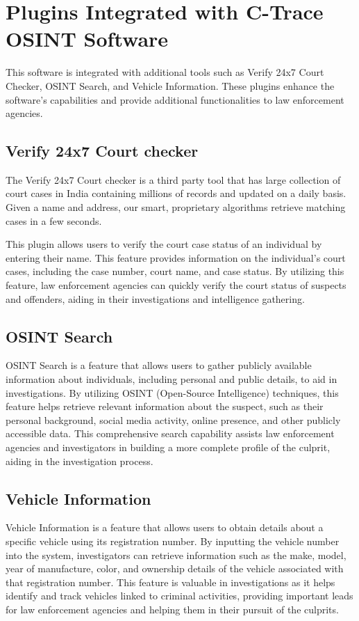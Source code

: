 \section{Plugins Integrated with C-Trace OSINT Software}

This software is integrated with additional tools such as Verify 24x7 Court Checker, OSINT
Search, and Vehicle Information. These plugins enhance the software's capabilities and provide additional functionalities to law enforcement agencies.

\subsection{Verify 24x7 Court checker}

The Verify 24x7 Court checker is a third party tool that has large collection of court cases in India containing millions of records and updated on a daily basis. Given a name and address, our smart, proprietary algorithms retrieve matching cases in a few seconds.

This plugin allows users to verify the court case status of an individual by entering their name. This feature provides information on the individual's court cases, including the case number, court name, and case status. By utilizing this feature, law enforcement agencies can quickly verify the court status of suspects and offenders, aiding in their investigations and intelligence gathering.

\subsection{OSINT Search}

OSINT Search is a feature that allows users to gather publicly available information about individuals, including personal and public details, to aid in investigations. By utilizing OSINT (Open-Source Intelligence) techniques, this feature helps retrieve relevant information about the suspect, such as their personal background, social
media activity, online presence, and other publicly accessible data. This
comprehensive search capability assists law enforcement agencies and investigators in building a more complete profile of the culprit, aiding in the investigation process.

\subsection{Vehicle Information}

Vehicle Information is a feature that allows users to obtain details about a specific vehicle using its registration number. By inputting the vehicle number into the system, investigators can retrieve information such as the make, model, year of manufacture, color, and ownership details of the vehicle associated with that registration number. This feature is valuable in investigations as it helps identify and
track vehicles linked to criminal activities, providing important leads for law enforcement agencies and helping them in their pursuit of the culprits.

\newpage


